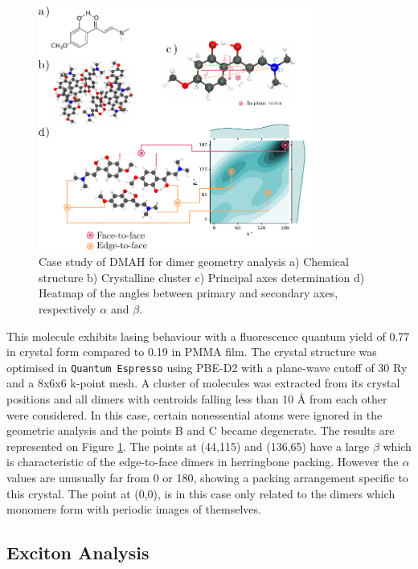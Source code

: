 \begin{figure}[ht]
\centering
  \includegraphics[width=9cm]{Chapters/6Implementation/hp3.pdf}
  \caption{Case study of DMAH for dimer geometry analysis a) Chemical structure b) Crystalline cluster c) Principal axes determination d) Heatmap of the angles between primary and secondary axes, respectively $\alpha$ and $\beta$.}
  \label{fig:angles_setup}
\end{figure}

 This molecule exhibits lasing behaviour with a fluorescence quantum yield of 0.77 in crystal form compared to 0.19 in PMMA film.\cite{Tang2016a} The crystal structure was optimised in \texttt{Quantum Espresso} using PBE-D2 with a plane-wave cutoff of 30 Ry and a 8x6x6 k-point mesh. A cluster of molecules was extracted from its crystal positions and all dimers with centroids falling less than 10 \AA{} from each other were considered. In this case, certain nonessential atoms were ignored in the geometric analysis and the points B and C became degenerate. The results are represented on Figure \ref{fig:angles_setup}. The points at (44\degree{},115\degree{}) and (136\degree{},65\degree{}) have a large $\beta$ which is characteristic of the edge-to-face dimers in herringbone packing. However the $\alpha$ values are unusually far from 0\degree{} or 180\degree, showing a packing arrangement specific to this crystal. The point at (0\degree{},0\degree{}), is in this case only related to the dimers which monomers form with periodic images of themselves.


\subsection{Exciton Analysis}


